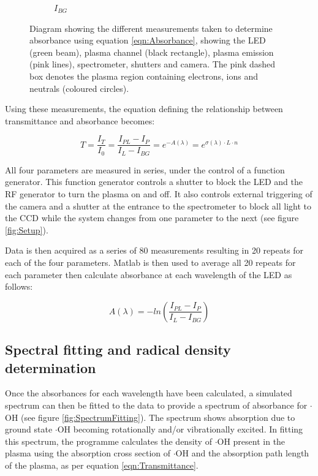 \documentclass[11pt, oneside]{article}   	%
\begin{document}
\begin{figure}
\begin{subfigure}{0.45\textwidth}
    		\caption{$I_{BG}$}
    		\label{subfig:Ibg}
	\end{subfigure}
	\caption{Diagram showing the different measurements taken to determine absorbance using equation \ref{eqn:Absorbance}, showing the LED (green beam), plasma channel (black rectangle), plasma emission (pink lines), spectrometer, shutters and camera. The pink dashed box denotes the plasma region containing electrons, ions and neutrals (coloured circles).}
\end{figure}

Using these measurements, the equation defining the relationship between transmittance and absorbance becomes:

\begin{equation} \label{eqn:4ParamTransmittance}
    T = \frac{I_T}{I_0} = \frac{I_{PL} - I_P}{I_L - I_{BG}} = e^{-A(\lambda)} = e^{\sigma(\lambda) \cdot L \cdot n}
\end{equation}

All four parameters are measured in series, under the control of a function generator.
This function generator controls a shutter to block the LED and the RF generator to turn the plasma on and off. It also controls external triggering of the camera and a shutter at the entrance to the spectrometer to block all light to the CCD while the system changes from one parameter to the next (see figure \ref{fig:Setup}). 

Data is then acquired as a series of 80 measurements resulting in 20 repeats for each of the four parameters.
Matlab is then used to average all 20 repeats for each parameter then calculate absorbance at each wavelength of the LED as follows:

\begin{equation}\label{eqn:Absorbance}
    A(\lambda) = -ln(\frac{I_{PL} - I_P}{I_L - I_{BG}})
\end{equation}

\subsection{Spectral fitting and radical density determination}

Once the absorbances for each wavelength have been calculated, a simulated spectrum can then be fitted to the data to provide a spectrum of absorbance for $\cdot$OH (see figure \ref{fig:SpectrumFitting}). 
The spectrum shows absorption due to ground state $\cdot$OH becoming rotationally and/or vibrationally excited.
In fitting this spectrum, the programme calculates the density of $\cdot$OH present in the plasma using the absorption cross section of $\cdot$OH and the absorption path length of the plasma, as per equation \ref{eqn:Transmittance}.
\end{document}
